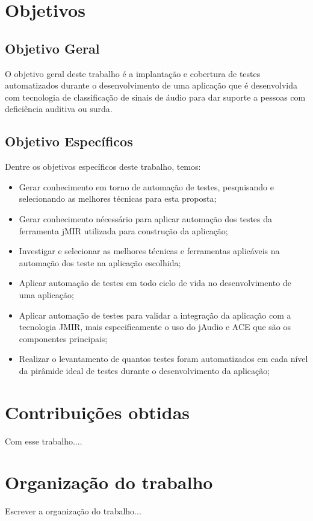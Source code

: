 \section{Objetivos} 

\subsection{Objetivo Geral}

O objetivo geral deste trabalho é a implantação e cobertura de testes automatizados durante o desenvolvimento de uma aplicação que é desenvolvida com tecnologia de classificação de sinais de áudio para dar suporte a pessoas com deficiência auditiva ou surda.

\subsection{Objetivo Específicos}
Dentre os objetivos específicos deste trabalho, temos:  
\begin{itemize}
	\item Gerar conhecimento em torno de automação de testes, pesquisando e selecionando as melhores técnicas para esta proposta;
	\item Gerar conhecimento nécessário para aplicar automação dos testes da ferramenta jMIR utilizada para construção da aplicação;
	\item Investigar e selecionar as melhores técnicas e ferramentas aplicáveis na automação dos teste na aplicação escolhida;
	\item Aplicar automação de testes em todo ciclo de vida no desenvolvimento de uma aplicação;	
	\item Aplicar automação de testes para validar a integração da aplicação com a tecnologia JMIR, mais especificamente o uso do jAudio e ACE que são os componentes principais;
	\item Realizar o levantamento de quantos testes foram automatizados em cada nível da pirâmide ideal de testes durante o desenvolvimento da aplicação;
\end{itemize}


\section{Contribuições obtidas}

Com esse trabalho.... 

\section{Organização do trabalho}

Escrever a organização do trabalho...